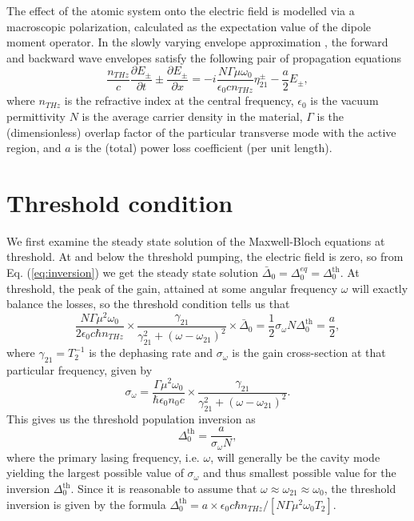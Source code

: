 \documentclass[preprint,secnumarabic,amssymb, nobibnotes, aip, prd]{revtex4-1}
\begin{document}
The effect of the atomic system onto the electric field is modelled via a macroscopic polarization, calculated as the expectation value of the dipole moment operator. In the slowly varying envelope approximation \cite{boyd2003nonlinear}, the forward and backward wave envelopes satisfy the following pair of propagation equations 
\begin{equation}
\frac{n_{THz}}{c}\frac{\partial E_{\pm}}{\partial {t}}\pm\frac{\partial E_{\pm}}{\partial {x}}=-i\frac{N\Gamma\mu\omega_0}{\epsilon_0 c n_{THz}}\eta_{21}^{\pm}-\frac{a}{2}E_{\pm
}, \label{eq:waves}%
\end{equation}	
where $n_{THz}$ is the refractive index at the central frequency, $\epsilon_0$ is the vacuum permittivity $N$ is the average carrier density in the material, $\Gamma$ is the (dimensionless) overlap factor of the particular transverse mode with the active region, and $a$ is the (total) power loss coefficient (per unit length).

\section{Threshold condition}

We first examine the steady state solution of the Maxwell-Bloch equations at threshold. At and below the threshold pumping, the electric field is zero, so from Eq. (\ref{eq:inversion}) we get the steady state solution $\bar{\Delta}_0 = \Delta_{0}^{eq} = \Delta_0^{\text{th}}$. At threshold, the peak of the gain, attained at some angular frequency $\omega$ will exactly balance the losses, so the threshold condition tells us that
\begin{equation}
\label{eq:gain-loss-threshold}
\frac{N\Gamma\mu^2\omega_0}{2 \epsilon_0 c \hbar n_{THz}}\times\frac{\gamma_{21}}{\gamma_{21}^2+(\omega-\omega_{21})^2}\times\bar{\Delta}_0 =\frac{1}{2}\sigma_\omega N \Delta_0^{\text{th}} = \frac{a}{2},
\end{equation}
where $\gamma_{21} = T_2^{-1}$ is the dephasing rate and $\sigma_\omega$ is the gain cross-section at that particular frequency, given by
\begin{equation}
\label{eq:cross-section}
\sigma_\omega = \frac{\Gamma \mu^2\omega_{0}}{\hbar\epsilon_0n_0c}\times\frac{\gamma_{21}}{\gamma_{21}^2+(\omega-\omega_{21})^2}.
\end{equation}
This gives us the threshold population inversion as 
\begin{equation}
\label{eq:threshold-inversion}
\Delta_0^{\text{th}} = \frac{a}{\sigma_{\omega}N}, 
\end{equation}
where the primary lasing frequency, i.e. $\omega$, will generally be the cavity mode yielding the largest possible value of $\sigma_\omega$ and thus smallest possible value for the inversion $\Delta_{0}^{\text{th}}$. Since it is reasonable to assume that $\omega \approx \omega_{21}\approx\omega_0$, the threshold inversion is given by the formula $\Delta_0^{\text{th}} = a \times \epsilon_0 c \hbar n_{THz}/\left [N\Gamma\mu^2\omega_0 T_2\right ]$.
\end{document}
